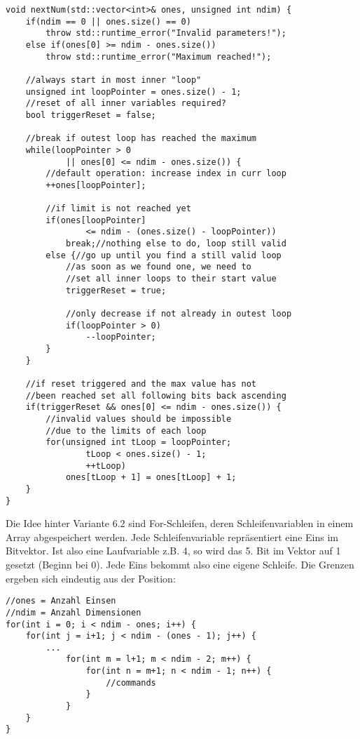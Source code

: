 \documentclass{article}
\begin{document}
\lstset{language=C++}

\begin{lstlisting}[frame=single]
void nextNum(std::vector<int>& ones, unsigned int ndim) {
    if(ndim == 0 || ones.size() == 0)
        throw std::runtime_error("Invalid parameters!");
    else if(ones[0] >= ndim - ones.size())
        throw std::runtime_error("Maximum reached!");

    //always start in most inner "loop"
    unsigned int loopPointer = ones.size() - 1;
    //reset of all inner variables required?
    bool triggerReset = false;

    //break if outest loop has reached the maximum
    while(loopPointer > 0
            || ones[0] <= ndim - ones.size()) {
        //default operation: increase index in curr loop
        ++ones[loopPointer];

        //if limit is not reached yet
        if(ones[loopPointer]
                <= ndim - (ones.size() - loopPointer))
            break;//nothing else to do, loop still valid
        else {//go up until you find a still valid loop
            //as soon as we found one, we need to
            //set all inner loops to their start value
            triggerReset = true;

            //only decrease if not already in outest loop
            if(loopPointer > 0)
                --loopPointer;
        }
    }

    //if reset triggered and the max value has not
    //been reached set all following bits back ascending
    if(triggerReset && ones[0] <= ndim - ones.size()) {
        //invalid values should be impossible
        //due to the limits of each loop
        for(unsigned int tLoop = loopPointer;
                tLoop < ones.size() - 1;
                ++tLoop)
            ones[tLoop + 1] = ones[tLoop] + 1;
    }
}
\end{lstlisting}

Die Idee hinter Variante 6.2 sind For-Schleifen, deren Schleifenvariablen in einem Array abgespeichert werden. Jede Schleifenvariable repräsentiert eine Eins im Bitvektor. Ist also eine Laufvariable z.B. 4, so wird das 5. Bit im Vektor auf 1 gesetzt (Beginn bei 0). Jede Eins bekommt also eine eigene Schleife. Die Grenzen ergeben sich eindeutig aus der Position:

\begin{lstlisting}[frame=single]
//ones = Anzahl Einsen
//ndim = Anzahl Dimensionen
for(int i = 0; i < ndim - ones; i++) {
    for(int j = i+1; j < ndim - (ones - 1); j++) {
        ...
            for(int m = l+1; m < ndim - 2; m++) {
                for(int n = m+1; n < ndim - 1; n++) {
                    //commands
                }
            }
    }
}
\end{lstlisting}
\end{document}

